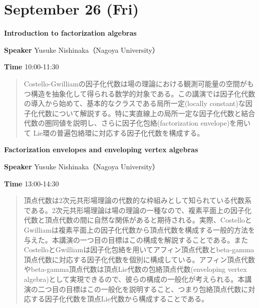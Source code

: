 \documentclass{ltjsarticle}
\theoremstyle{mystyle} %
\numberwithin{equation}{section}
\newcommand{\spkE}{Yusuke Nishinaka}
\newcommand{\instE}{Nagoya University}
\newcommand{\titleE}{Introduction to factorization algebras}
\newcommand{\titleEE}{Factorization envelopes and enveloping vertex algebras}
\newcommand{\abst}[5]{
    \Large
    \textbf{#1}
    \normalsize
    
    \vspace{10pt}

    \textbf{Speaker} #2（#3）

    \textbf{Time} #4

    \vspace{5pt}

    \begin{quote}
        #5
    \end{quote}

    \vspace{10pt}
}
\begin{document}
\newpage

\section*{September 26 (Fri)}

\abst{\titleE}{\spkE}{\instE}{10:00-11:30}{
    Costello-Gwilliamの因子化代数は場の理論における観測可能量の空間がもつ構造を抽象化して得られる数学的対象である。この講演では因子化代数の導入から始めて、基本的なクラスである局所一定(locally constant)な因子化代数について解説する。特に実直線上の局所一定な因子化代数と結合代数の圏同値を説明し、さらに因子化包絡(factorization envelope)を用いて Lie環の普遍包絡環に対応する因子化代数を構成する。
}

\abst{\titleEE}{\spkE}{\instE}{13:00-14:30}{
    頂点代数は2次元共形場理論の代数的な枠組みとして知られている代数系である。2次元共形場理論は場の理論の一種なので、複素平面上の因子化代数と頂点代数の間に自然な関係があると期待される。実際、CostelloとGwilliamは複素平面上の因子化代数から頂点代数を構成する一般的方法を与えた。本講演の一つ目の目標はこの構成を解説することである。またCostelloとGwilliamは因子化包絡を用いてアフィン頂点代数とbeta-gamma頂点代数に対応する因子化代数を個別に構成している。アフィン頂点代数やbeta-gamma頂点代数は頂点Lie代数の包絡頂点代数(enveloping vertex algebra)として実現できるので、彼らの構成の一般化が考えられる。本講演の二つ目の目標はこの一般化を説明すること、つまり包絡頂点代数に対応する因子化代数を頂点Lie代数から構成することである。
}
\end{document}
